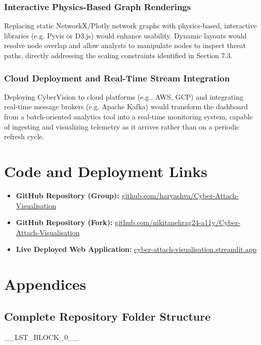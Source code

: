 \documentclass[a4paper, 12pt]{report}
\begin{document}
\subsection{Interactive Physics-Based Graph Renderings}
Replacing static NetworkX/Plotly network graphs with physics-based, interactive libraries (e.g. Pyvis or D3.js) would enhance usability. Dynamic layouts would resolve node overlap and allow analysts to manipulate nodes to inspect threat paths, directly addressing the scaling constraints identified in Section 7.3.

\subsection{Cloud Deployment and Real-Time Stream Integration}
Deploying CyberVision to cloud platforms (e.g., AWS, GCP) and integrating real-time message brokers (e.g. Apache Kafka) would transform the dashboard from a batch-oriented analytics tool into a real-time monitoring system, capable of ingesting and visualizing telemetry as it arrives rather than on a periodic refresh cycle.

\newpage
\chapter{Code and Deployment Links}
\begin{itemize}
    \item \textbf{GitHub Repository (Group):} \href{https://github.com/haryashva/Cyber-Attach-Visualisation}{github.com/haryashva/Cyber-Attach-Visualisation}
    \item \textbf{GitHub Repository (Fork):} \href{https://github.com/nikitanehrag24-a11y/Cyber-Attach-Visualisation}{github.com/nikitanehrag24-a11y/Cyber-Attach-Visualisation}
    \item \textbf{Live Deployed Web Application:} \href{https://cyber-attach-visualisation-dawavmaacerhnvodttg9rb.streamlit.app/}{cyber-attach-visualisation.streamlit.app}
\end{itemize}




\newpage
\appendix
\chapter{Appendices}

\section{Complete Repository Folder Structure}
\_\_LST\_BLOCK\_0\_\_
\end{document}
